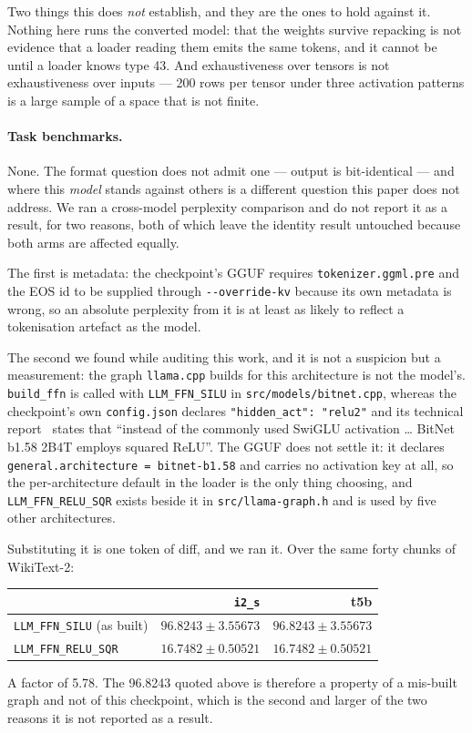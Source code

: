 \documentclass[11pt,a4paper]{article}
\newcommand{\code}[1]{\texttt{#1}}
\begin{document}
Two things this does \emph{not} establish, and they are the ones to hold against
it. Nothing here runs the converted model: that the weights survive repacking is
not evidence that a loader reading them emits the same tokens, and it cannot be
until a loader knows type 43. And exhaustiveness over tensors is not
exhaustiveness over inputs --- 200 rows per tensor under three activation
patterns is a large sample of a space that is not finite.

\paragraph{Task benchmarks.} None. The format question does not admit one ---
output is bit-identical --- and where this \emph{model} stands against
others is a different question this paper does not address. We ran a cross-model
perplexity comparison and do not report it as a result, for two reasons, both of
which leave the identity result untouched because both arms are affected
equally.

The first is metadata: the checkpoint's GGUF requires \code{tokenizer.ggml.pre}
and the EOS id to be supplied through \code{-{}-override-kv} because its own
metadata is wrong, so an absolute perplexity from it is at least as likely to
reflect a tokenisation artefact as the model.

The second we found while auditing this work, and it is not a suspicion but a
measurement: the graph \code{llama.cpp} builds for this architecture is not the
model's. \code{build\_ffn} is called with \code{LLM\_FFN\_SILU} in
\code{src/models/bitnet.cpp}, whereas the checkpoint's own \code{config.json}
declares \code{"hidden\_act": "relu2"} and its technical
report~\cite{bitnet2b4t} states that ``instead of the commonly used SwiGLU
activation \dots{} BitNet b1.58 2B4T employs squared ReLU''. The GGUF does not
settle it: it declares \code{general.architecture = bitnet-b1.58} and carries no
activation key at all, so the per-architecture default in the loader is the only
thing choosing, and \code{LLM\_FFN\_RELU\_SQR} exists beside it in
\code{src/llama-graph.h} and is used by five other architectures.

Substituting it is one token of diff, and we ran it. Over the same forty chunks
of WikiText-2:
\begin{center}
\begin{tabular}{lrr}
\toprule
 & \code{i2\_s} & \textbf{t5b} \\
\midrule
\code{LLM\_FFN\_SILU} (as built)   & $\num{96.8243}\pm\num{3.55673}$ & $\num{96.8243}\pm\num{3.55673}$ \\
\code{LLM\_FFN\_RELU\_SQR}         & $\num{16.7482}\pm\num{0.50521}$ & $\num{16.7482}\pm\num{0.50521}$ \\
\bottomrule
\end{tabular}
\end{center}
A factor of \num{5.78}. The \num{96.8243} quoted above is therefore a property
of a mis-built graph and not of this checkpoint, which is the second and larger
of the two reasons it is not reported as a result.
\end{document}
